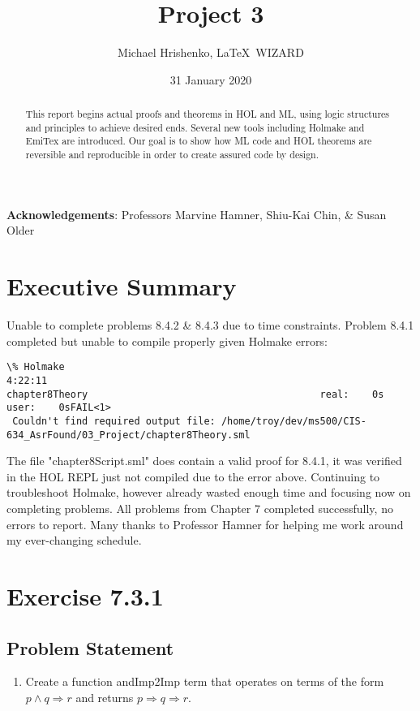 \documentclass[twoside]{report}
\title{Project 3}
\date{31 January 2020}
\author{Michael Hrishenko, \LaTeX\ WIZARD}
\begin{document}
\lstset{language=ML}
\maketitle
\begin{abstract}
This report begins actual proofs and theorems in HOL and ML, using logic structures and principles to achieve desired ends. Several new tools including Holmake and EmiTex are introduced. Our goal is to show how ML code and HOL theorems are reversible and reproducible in order to create assured code by design.
\end{abstract}

\textbf{Acknowledgements}: Professors Marvine Hamner, Shiu-Kai Chin, \& Susan Older

\tableofcontents

\chapter{Executive Summary}
\label{cha:executive-summary}
Unable to complete problems 8.4.2 \& 8.4.3 due to time constraints. Problem 8.4.1 completed but unable to compile properly given Holmake errors:
\begin{scriptsize}
    \begin{verbatim}
\% Holmake                                                                     4:22:11
chapter8Theory                                        real:    0s  user:    0sFAIL<1>
 Couldn't find required output file: /home/troy/dev/ms500/CIS-634_AsrFound/03_Project/chapter8Theory.sml
     \end{verbatim}
\end{scriptsize}
The file "chapter8Script.sml" does contain a valid proof for 8.4.1, it was verified in the HOL REPL just not compiled due to the error above. Continuing to troubleshoot Holmake, however already wasted enough time and focusing now on completing problems. All problems from Chapter 7 completed successfully, no errors to report. Many thanks to Professor Hamner for helping me work around my ever-changing schedule.


\chapter{Exercise 7.3.1}
\label{cha:7-3-1}
\section{Problem Statement}
\begin{enumerate}
    \item Create a function andImp2Imp term that operates on terms of the form $p \wedge  q \Rightarrow r$ and returns $p \Rightarrow q \Rightarrow r$.
\end{enumerate}
\end{document}
